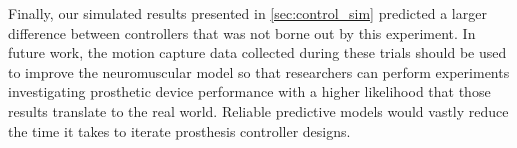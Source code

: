 Finally, our simulated results presented in \cref{sec:control_sim} predicted a
larger difference between controllers that was not borne out by this experiment.
In future work, the motion capture data collected during these trials should be
used to improve the neuromuscular model so that researchers can perform
experiments investigating prosthetic device performance with a higher likelihood
that those results translate to the real world. Reliable predictive models would
vastly reduce the time it takes to iterate prosthesis controller designs.

